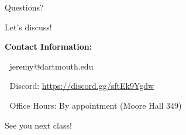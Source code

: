 \documentclass[aspectratio=169]{beamer}
\begin{document}
\begin{frame}{Questions? 🤔}
\begin{center}
\Large{Let's discuss!}

\vspace{0.5cm}

\textbf{Contact Information:}

📧 jeremy@dartmouth.edu

💬 Discord: \href{https://discord.gg/sftEk9Ygdw}{https://discord.gg/sftEk9Ygdw}

🏢 Office Hours: By appointment (Moore Hall 349)

\vspace{0.5cm}

\large{See you next class! 🚀}
\end{center}
\end{frame}
\end{document}
